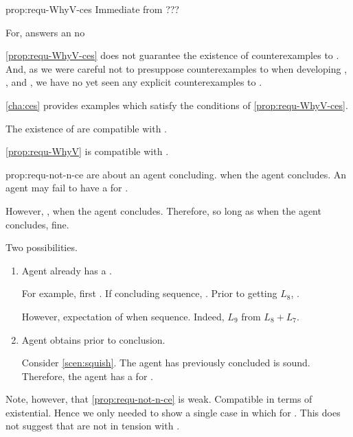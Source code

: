 \begin{note}
  \begin{argument}{prop:requ-WhyV-ces}
    \color{blue}
    Immediate from ???

    For, \ros{} answers \qWhy{} an no \wit{}
  \end{argument}
\end{note}

\begin{note}
  \autoref{prop:requ-WhyV-ces} does not guarantee the existence of counterexamples to \issueConstraint{}.
  And, as we were careful not to presuppose counterexamples to \issueConstraint{} when developing , , and , we have no yet seen any explicit counterexamples to \issueConstraint{}.

  \autoref{cha:ces} provides examples which satisfy the conditions of \autoref{prop:requ-WhyV-ces}.
\end{note}

\begin{note}
  The existence of  are compatible with \issueConstraint{}.

  \begin{observation}%
    \label{prop:requ-not-n-ce}%
    \autoref{prop:requ-WhyV} is compatible with \issueConstraint{}.
  \end{observation}

  \begin{motivation}{prop:requ-not-n-ce}
     are about an agent concluding.
    \fc{} when the agent concludes.
    An agent may fail to have a \wit{} for \fc{}.

    However, \issueConstraint{}, \wit{} when the agent concludes.
    Therefore, so long as \wit{} when the agent concludes, fine.

    Two possibilities.
    \begin{enumerate}
    \item
      Agent already has a \wit{}.

      For example, first .
      If concluding sequence, \fc{}.
      Prior to getting \(L_{8}\), \fc{}.

      However, expectation of \wit{} when sequence.
      Indeed, \(L_{9}\) from \(L_{8} + L_{7}\).
    \item
      Agent obtains \wit{} prior to conclusion.

      Consider \autoref{scen:squish}.
      The agent has previously concluded \sqE{} is sound.
      Therefore, the agent has a \wit{} for \ros{}.
    \end{enumerate}
    \vspace{-\baselineskip}
  \end{motivation}

  Note, however, that \autoref{prop:requ-not-n-ce} is weak.
  Compatible in terms of existential.
  Hence we only needed to show a single case in which \wit{} for \requ{}.
  This does not suggest that  are not in tension with \issueConstraint{}.
\end{note}



